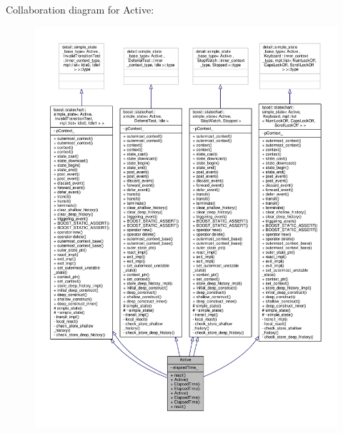 Collaboration diagram for Active\+:
\nopagebreak
\begin{figure}[H]
\begin{center}
\leavevmode
\includegraphics[width=350pt]{struct_active__coll__graph}
\end{center}
\end{figure}
